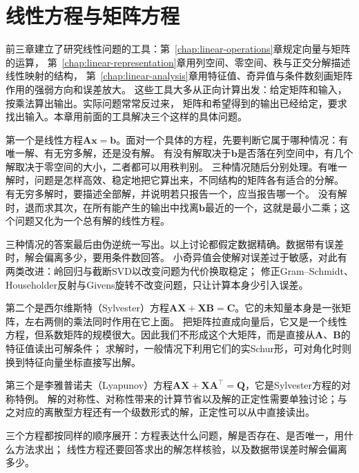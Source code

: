 \chapter{线性方程与矩阵方程}
\label{chap:linear-equations-and-optimization}
\label{sec:linear-algebra-reachability-solvability}

前三章建立了研究线性问题的工具：第~\ref{chap:linear-operations}章规定向量与矩阵的运算，
第~\ref{chap:linear-representation}章用列空间、零空间、秩与正交分解描述线性映射的结构，
第~\ref{chap:linear-analysis}章用特征值、奇异值与条件数刻画矩阵作用的强弱方向和误差放大。
这些工具大多从正向计算出发：给定矩阵和输入，按乘法算出输出。实际问题常常反过来，
矩阵和希望得到的输出已经给定，要求找出输入。本章用前面的工具解决三个这样的具体问题。

第一个是线性方程$\bm A\bm x=\bm b$。面对一个具体的方程，先要判断它属于哪种情况：有唯一解、有无穷多解，还是没有解。
有没有解取决于$\bm b$是否落在列空间中，有几个解取决于零空间的大小，二者都可以用秩判别。
三种情况随后分别处理。有唯一解时，问题是怎样高效、稳定地把它算出来，不同结构的矩阵各有适合的分解。
有无穷多解时，要描述全部解，并说明若只报告一个，应当报告哪一个。
没有解时，退而求其次，在所有能产生的输出中找离$\bm b$最近的一个，这就是最小二乘；这个问题又化为一个总有解的线性方程。

三种情况的答案最后由伪逆统一写出。以上讨论都假定数据精确。数据带有误差时，解会偏离多少，要用条件数回答。
小奇异值会使解对误差过于敏感，对此有两类改进：岭回归与截断SVD以改变问题为代价换取稳定；
修正Gram--Schmidt、Householder反射与Givens旋转不改变问题，只让计算本身少引入误差。

第二个是西尔维斯特（Sylvester）方程$\bm A\bm X+\bm X\bm B=\bm C$。它的未知量本身是一张矩阵，左右两侧的乘法同时作用在它上面。
把矩阵拉直成向量后，它又是一个线性方程，但系数矩阵的规模很大。因此我们不形成这个大矩阵，而是直接从$\bm A$、$\bm B$的特征值读出可解条件；
求解时，一般情况下利用它们的实Schur形，可对角化时则换到特征向量坐标直接写出解。

第三个是李雅普诺夫（Lyapunov）方程$\bm A\bm X+\bm X\bm A^\top=\bm Q$，它是Sylvester方程的对称特例。
解的对称性、对称性带来的计算节省以及解的正定性需要单独讨论；与之对应的离散型方程还有一个级数形式的解，正定性可以从中直接读出。

三个方程都按同样的顺序展开：方程表达什么问题，解是否存在、是否唯一，用什么方法求出；
线性方程还要回答求出的解怎样核验，以及数据带误差时解会偏离多少。




